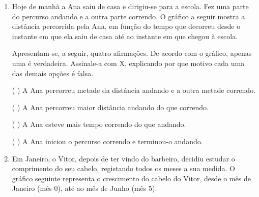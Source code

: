 \begin{enumerate}
\begin{enumerate}
\end{enumerate}

\item Hoje de manhã a Ana saiu de casa e dirigiu-se para a escola. Fez uma parte do percurso andando e a outra parte correndo. O gráfico a seguir mostra a distância percorrida pela Ana, em função do tempo que decorreu desde o instante em que ela saiu de casa até ao instante em que chegou à escola.
\begin{center}\end{center}
Apresentam-se, a seguir, quatro afirmações. De acordo com o gráfico, apenas uma é verdadeira. Assinale-a com X, explicando por que motivo cada uma das demais opções é falsa.

( { } ) A Ana percorreu metade da distância andando e a outra metade correndo.

( { } ) A Ana percorreu maior distância andando do que correndo.

( { } ) A Ana esteve mais tempo correndo do que andando.

( { } ) A Ana iniciou o percurso correndo e terminou-o andando.

\item Em Janeiro, o Vitor, depois de ter vindo do barbeiro, decidiu estudar o comprimento do seu cabelo, registando todos os meses a sua medida. O gráfico seguinte representa o crescimento do cabelo do Vitor, desde o mês de Janeiro (mês 0), até ao mês de Junho (mês 5).
\label{\detokenize{AF106-E1:fig-cabelo}}


\end{enumerate}

